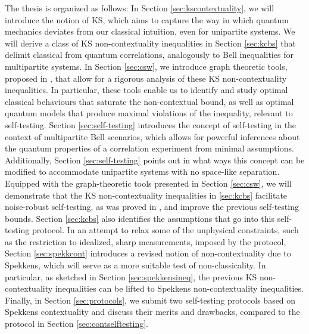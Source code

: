 The thesis is organized as follows:
In Section \ref{sec:kscontextuality}, we will introduce the notion of KS, which aims to capture the way in which quantum mechanics deviates from our classical intuition, even for unipartite systems. We will derive a class of KS non-contextuality inequalities in Section \ref{sec:kcbs} that delimit classical from quantum correlations, analogously to Bell inequalities for multipartite systems. In Section \ref{sec:csw}, we introduce graph theoretic tools, proposed in \cite{Cabello2014}, that allow for a rigorous analysis of these KS non-contextuality inequalities. In particular, these tools enable us to identify and study optimal classical behaviours that saturate the non-contextual bound, as well as optimal quantum models that produce maximal violations of the inequality, relevant to self-testing. Section \ref{sec:self-testing} introduces the concept of self-testing in the context of multipartite Bell scenarios, which allows for powerful inferences about the quantum properties of a correlation experiment from minimal assumptions. Additionally, Section \ref{sec:self-testing} points out in what ways this concept can be modified to accommodate unipartite systems with no space-like separation. Equipped with the graph-theoretic tools presented in Section \ref{sec:csw}, we will demonstrate that the KS non-contextuality inequalities in \ref{sec:kcbs} facilitate noise-robust self-testing, as was proved in \cite{Bharti2019}, and improve the previous self-testing bounds. Section \ref{sec:kcbs} also identifies the assumptions that go into this self-testing protocol. In an attempt to relax some of the unphysical constraints, such as the restriction to idealized, sharp measurements, imposed by the protocol, Section \ref{sec:spekkcont} introduces a revised notion of non-contextuality due to Spekkens, which will serve as a more suitable test of non-classicality. In particular, as sketched in Section \ref{sec:spekkensineq}, the previous KS non-contextuality inequalities can be lifted to Spekkens non-contextuality inequalities. Finally, in Section \ref{sec:protocols}, we submit two self-testing protocols based on Spekkens contextuality and discuss their merits and drawbacks, compared to the protocol in Section \ref{sec:contselftesting}.